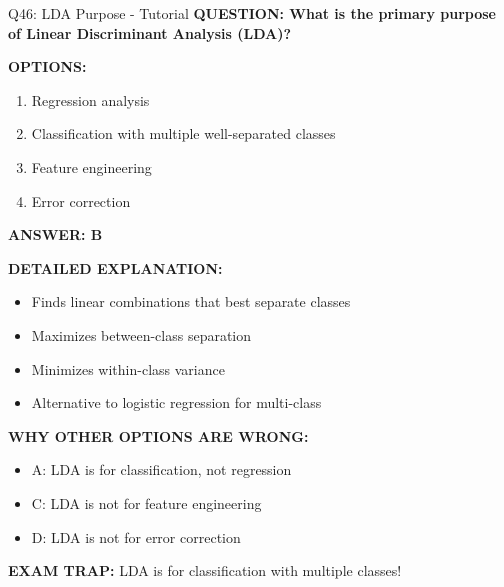 \documentclass[8pt]{beamer}
\begin{document}
	\begin{frame}{Q46: LDA Purpose - Tutorial}
		\fontsize{6.5}{7.5}\selectfont
		\textbf{QUESTION: What is the primary purpose of Linear Discriminant Analysis (LDA)?}
		
		\vspace{0.1cm}
		\textbf{OPTIONS:}
		\begin{enumerate}
			\item Regression analysis
			\item Classification with multiple well-separated classes
			\item Feature engineering
			\item Error correction
		\end{enumerate}
		
		\vspace{0.1cm}
		\textcolor{myblue}{\textbf{ANSWER: B}}
		
		\vspace{0.1cm}
		\textbf{DETAILED EXPLANATION:}
		\begin{itemize}
			\item Finds linear combinations that best separate classes
			\item Maximizes between-class separation
			\item Minimizes within-class variance
			\item Alternative to logistic regression for multi-class
		\end{itemize}
		
		\vspace{0.1cm}
		\textcolor{myred}{\textbf{WHY OTHER OPTIONS ARE WRONG:}}
		\begin{itemize}
			\item \textcolor{myred}{A:} LDA is for classification, not regression
			\item \textcolor{myred}{C:} LDA is not for feature engineering
			\item \textcolor{myred}{D:} LDA is not for error correction
		\end{itemize}
		
		\textcolor{myred}{\textbf{EXAM TRAP:}} LDA is for \textcolor{myblue}{classification with multiple classes}!
	\end{frame}
	
\end{document}

